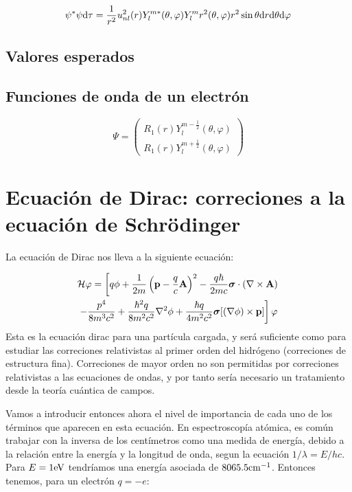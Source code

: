 \begin{equation}
    \psi^* \psi \mathrm{d} \tau = \frac{1}{r^2} u_{nl}^2 (r) Y_l^{m*} (\theta , \varphi)  Y_l^m r^2 (\theta , \varphi) r^2 \sin \theta \mathrm{d} r \mathrm{d} \theta \mathrm{d} \varphi
\end{equation}


\subsection{Valores esperados}

\subsection{Funciones de onda de un electrón}

\begin{equation}
    \Psi = \begin{pmatrix}
    R_1 (r) Y_l^{m-\frac{1}{2}} (\theta,\varphi) \\
    R_1 (r) Y_l^{m+\frac{1}{2}} (\theta,\varphi) 
    \end{pmatrix}
\end{equation}



\section{Ecuación de Dirac: correciones a la ecuación de Schrödinger}


La ecuación de Dirac nos lleva a la siguiente ecuación:

\begin{multline}
     \mathcal{H} \varphi = \left[ q \phi + \frac{1}{2m} \left( \mathbf{p}-\frac{q}{c}\mathbf{A} \right)^2 - \frac{q\hbar}{2mc} \boldsymbol{\sigma} \cdot (\nabla \times \mathbf{A})  \right. \\
    \left. - \frac{p^4}{8 m^3 c^2} + \frac{\hbar^2 q}{8 m^2 c^2} \nabla^2 \phi + \frac{ \hbar q}{4m^2 c^2} \boldsymbol{\sigma} [(\nabla \phi)\times \mathbf{p}] \right] \varphi
    \label{Ec:01-03-15}
\end{multline}
Esta es la ecuación dirac para una partícula cargada, y será suficiente como para estudiar las correciones relativistas al primer orden del hidrógeno (correciones de estructura fina). Correciones de mayor orden no son permitidas por correciones relativistas a las ecuaciones de ondas, y por tanto sería necesario un tratamiento desde la teoría cuántica de campos. 

Vamos a introducir entonces ahora el nivel de importancia de cada uno de los términos que aparecen en esta ecuación. En espectroscopía atómica, es común trabajar con la inversa de los centímetros como una medida de energía, debido a la relación entre la energía y la longitud de onda, segun la ecuación $1/\lambda = E/hc$. Para $E=1\text{eV}$ tendríamos una energía asociada de $8065.5 \text{cm}^{-1}$. Entonces tenemos, para un electrón $q=-e$:

